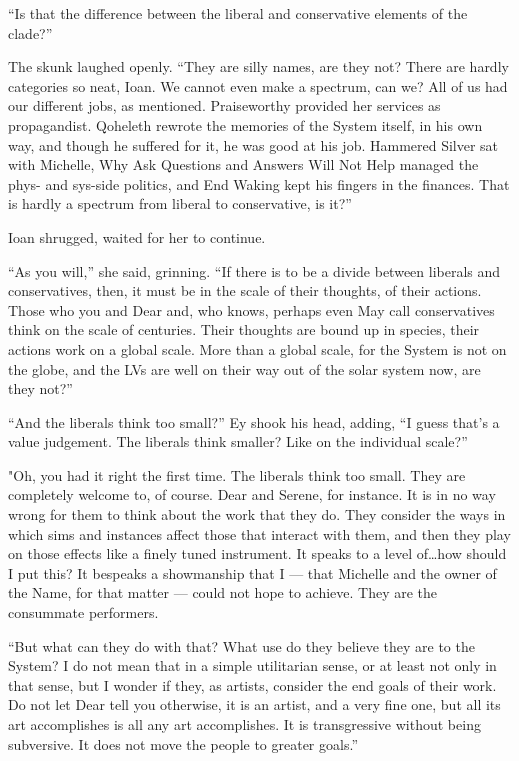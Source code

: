 ``Is that the difference between the liberal and conservative elements of the clade?''

The skunk laughed openly. ``They are silly names, are they not? There are hardly categories so neat, Ioan. We cannot even make a spectrum, can we? All of us had our different jobs, as mentioned. Praiseworthy provided her services as propagandist. Qoheleth rewrote the memories of the System itself, in his own way, and though he suffered for it, he was good at his job. Hammered Silver sat with Michelle, Why Ask Questions and Answers Will Not Help managed the phys- and sys-side politics, and End Waking kept his fingers in the finances. That is hardly a spectrum from liberal to conservative, is it?''

Ioan shrugged, waited for her to continue.

``As you will,'' she said, grinning. ``If there is to be a divide between liberals and conservatives, then, it must be in the scale of their thoughts, of their actions. Those who you and Dear and, who knows, perhaps even May call conservatives think on the scale of centuries. Their thoughts are bound up in species, their actions work on a global scale. More than a global scale, for the System is not on the globe, and the LVs are well on their way out of the solar system now, are they not?''

``And the liberals think too small?'' Ey shook his head, adding, ``I guess that's a value judgement. The liberals think smaller? Like on the individual scale?''

"Oh, you had it right the first time. The liberals think too small. They are completely welcome to, of course. Dear and Serene, for instance. It is in no way wrong for them to think about the work that they do. They consider the ways in which sims and instances affect those that interact with them, and then they play on those effects like a finely tuned instrument. It speaks to a level of\ldots how should I put this? It bespeaks a showmanship that I — that Michelle and the owner of the Name, for that matter — could not hope to achieve. They are the consummate performers.

``But what can they do with that? What use do they believe they are to the System? I do not mean that in a simple utilitarian sense, or at least not only in that sense, but I wonder if they, as artists, consider the end goals of their work. Do not let Dear tell you otherwise, it is an artist, and a very fine one, but all its art accomplishes is all any art accomplishes. It is transgressive without being subversive. It does not move the people to greater goals.''

